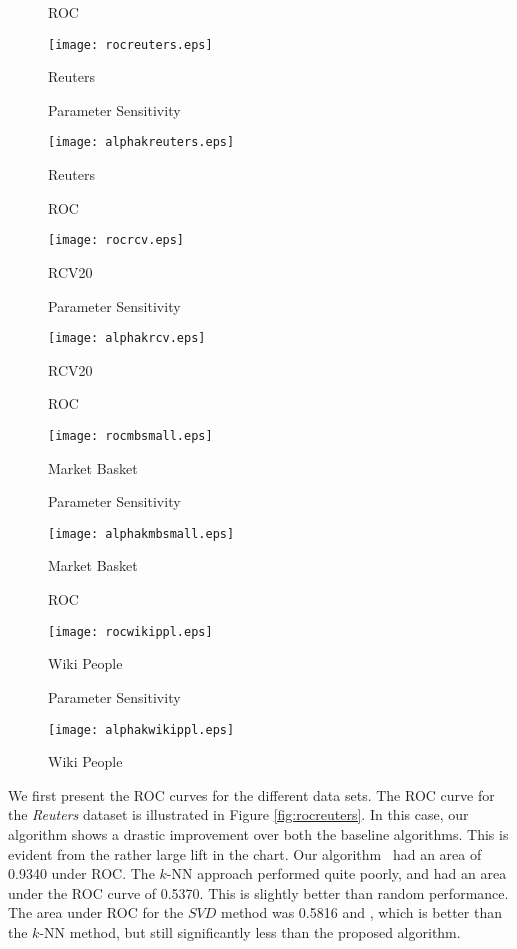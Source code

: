 \begin{figure*}[htbp]
 \begin{minipage}{0.5\linewidth}
  \centering
  \caption*{ROC}
  \texttt{[image: rocreuters.eps]}
  \caption{Reuters}
  \label{fig:rocreuters}
 \end{minipage}%
 \begin{minipage}{0.5\linewidth}
  \centering
  \caption*{Parameter Sensitivity}
  \texttt{[image: alphakreuters.eps]}
  \caption{Reuters}
  \label{fig:alphakreuters}
 \end{minipage}
 \begin{minipage}{0.5\linewidth}
  \centering
  \caption*{ROC}
  \texttt{[image: rocrcv.eps]}
  \caption{RCV20}
  \label{fig:rocrcv}
 \end{minipage}%
 \begin{minipage}{0.5\linewidth}
  \centering
  \caption*{Parameter Sensitivity}
  \texttt{[image: alphakrcv.eps]}
  \caption{RCV20}
  \label{fig:alphakrcv}
 \end{minipage}
  \begin{minipage}{0.5\linewidth}
  \centering
  \caption*{ROC}
  \texttt{[image: rocmbsmall.eps]}
  \caption{Market Basket}
  \label{fig:rocmb}
 \end{minipage}%
 \begin{minipage}{0.5\linewidth}
  \centering
  \caption*{Parameter Sensitivity}
  \texttt{[image: alphakmbsmall.eps]}
  \caption{Market Basket}
  \label{fig:alphakmb}
 \end{minipage}
  \begin{minipage}{0.5\linewidth}
  \centering
  \caption*{ROC}
  \texttt{[image: rocwikippl.eps]}
  \caption{Wiki People}
  \label{fig:rocwiki}
 \end{minipage}%
 \begin{minipage}{0.5\linewidth}
  \centering
  \caption*{Parameter Sensitivity}
  \texttt{[image: alphakwikippl.eps]}
  \caption{Wiki People}
  \label{fig:alphakwiki}
 \end{minipage}
\end{figure*}

We first present the ROC curves for the different data sets. The ROC
curve for the {\em Reuters} dataset is illustrated in Figure
\ref{fig:rocreuters}. In this case, our algorithm shows a drastic
improvement over both the baseline algorithms.  This is evident from
the rather large lift in the chart.   Our algorithm
\algo\, had an area of 0.9340 under ROC. The $k$-NN approach
performed quite poorly, and had an area under the  ROC curve of
0.5370. This is slightly better than random performance. The area
under ROC for the  $SVD$ method  was  0.5816 and , which is better than
the $k$-NN method, but still significantly less than the proposed
algorithm.

